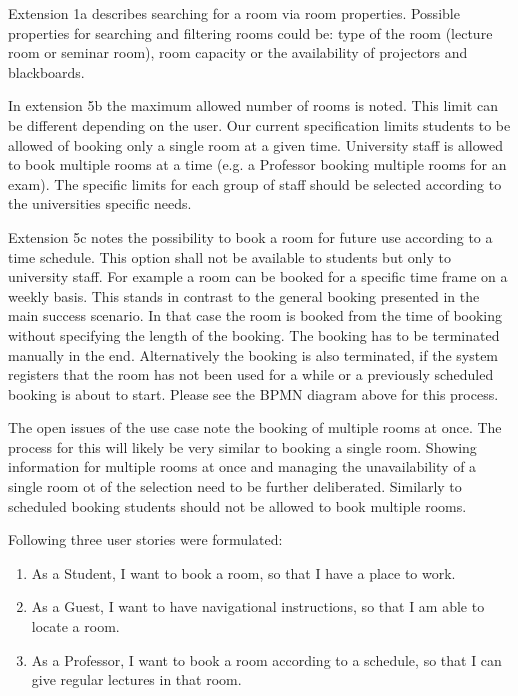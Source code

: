\documentclass[conference,onecolumn]{IEEEtran}
\begin{document}
Extension 1a describes searching for a room via room properties.
Possible properties for searching and filtering rooms could be: type of the room (lecture room or seminar room), room capacity or the availability of projectors and blackboards.

In extension 5b the maximum allowed number of rooms is noted. This limit can be different depending on the user. Our current specification limits students to be allowed of booking only a single room at a given time. University staff is allowed to book multiple rooms at a time (e.g. a Professor booking multiple rooms for an exam). The specific limits for each group of staff should be selected according to the universities specific needs.

Extension 5c notes the possibility to book a room for future use according to a time schedule. This option shall not be available to students but only to university staff. For example a room can be booked for a specific time frame on a weekly basis.
This stands in contrast to the general booking presented in the main success scenario. In that case the room is booked from the time of booking without specifying the length of the booking. The booking has to be terminated manually in the end. Alternatively the booking is also terminated, if the system registers that the room has not been used for a while or a previously scheduled booking is about to start. Please see the BPMN diagram above for this process. %

The open issues of the use case note the booking of multiple rooms at once.
The process for this will likely be very similar to booking a single room. Showing information for multiple rooms at once and managing the unavailability of a single room ot of the selection need to be further deliberated. Similarly to scheduled booking students should not be allowed to book multiple rooms.

Following three user stories were formulated:

\begin{enumerate}
	\item As a Student, I want to book a room, so that I have a place to work.
	\item As a Guest, I want to have navigational instructions, so that I am able to locate a room.
	\item As a Professor, I want to book a room according to a schedule, so that I can give regular lectures in that room.
\end{enumerate}
\end{document}
